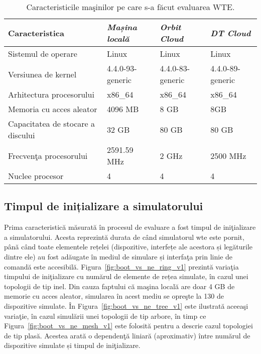 \begin{table}[h]
	
	\caption{Caracteristicile maşinilor pe care s-a făcut evaluarea WTE.\label{tab:resources}}
	\begin{tabular}{|M{0.25\textwidth}|M{0.2\textwidth}|M{0.2\textwidth}|M{0.2\textwidth}|}
		\hline
		\textbf{Caracteristica} & \textbf{\emph{Mașina locală}} & \textbf{\emph{Orbit Cloud}} & \textbf{\emph{DT Cloud}} \tabularnewline
		\hline 
		Sistemul de operare & Linux & Linux & Linux \tabularnewline
		\hline 
		Versiunea de kernel & 4.4.0-93-generic & 4.4.0-83-generic & 4.4.0-89-generic
		\tabularnewline
		\hline 
		Arhitectura procesorului & x86\_64 & x86\_64 & x86\_64 \tabularnewline
		\hline 
		Memoria cu acces aleator & 4096 MB & 8 GB & 8GB \tabularnewline
		\hline 
		Capacitatea de stocare a discului & 32 GB & 80 GB & 80 GB \tabularnewline
		\hline 
		Frecvenţa procesorului & 2591.59 MHz & 2 GHz & 2500 MHz \tabularnewline
		\hline 
		Nuclee procesor & 4 & 4 & 4 \tabularnewline
		\hline \end{tabular}
\end{table}


\subsection{Timpul de inițializare a simulatorului}

Prima caracteristică măsurată în procesul de evaluare a fost timpul de iniţializare a simulatorului. Acesta reprezintă durata de când simulatorul \gls{wte} este pornit, până când toate elementele rețelei (dispozitive, interfețe ale acestora și legăturile dintre ele) au fost adăugate în mediul de simulare și interfaţa prin linie de comandă este accesibilă. Figura~\ref{fig:boot_vs_ne_ring_v1} prezintă variaţia timpului de iniţializare cu numărul de elemente de rețea simulate, în cazul unei topologii de tip inel. Din cauza faptului că maşina locală are doar 4 GB de memorie cu acces aleator, simularea în acest mediu se opreşte la 130 de dispozitive simulate. În Figura~\ref{fig:boot_vs_ne_tree_v1} este ilustrată aceeaşi variaţie, în cazul simulării unei topologii de tip arbore, în timp ce Figura~\ref{fig:boot_vs_ne_mesh_v1} este folosită pentru a descrie cazul topologiei de tip plasă. Acestea arată o dependenţă liniară (aproximativ) între numărul de dispozitive simulate și timpul de iniţializare. 

